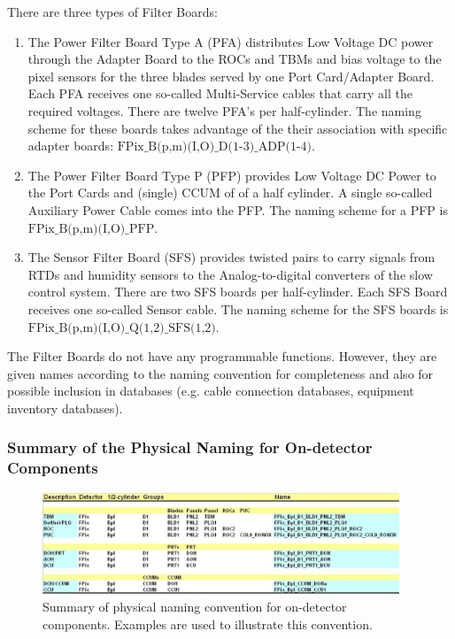 \documentclass{cmspaper}
\begin{document}
There are three types of Filter Boards:
\begin{enumerate}
\item The Power Filter Board Type A (PFA) distributes Low Voltage DC power 
through the Adapter Board to the ROCs and TBMs
and bias voltage to the pixel sensors for the three blades served by one Port Card/Adapter Board. Each PFA
receives one so-called Multi-Service cables that carry all the required voltages. There are twelve PFA's per 
half-cylinder. The naming scheme for these boards takes advantage of the their association with specific
adapter boards:
$\mbox{FPix\_B(p,m)(I,O)\_D(1-3)\_ADP(1-4)}$.
\item The Power Filter Board Type P (PFP) provides Low Voltage DC Power to the Port Cards and (single) CCUM of
of a half cylinder. A single so-called Auxiliary Power Cable comes into the PFP. The naming scheme for
a PFP is $\mbox{FPix\_B(p,m)(I,O)\_PFP}$.
\item The Sensor Filter Board (SFS) provides twisted pairs to carry signals from RTDs and humidity
sensors to the Analog-to-digital converters of the slow control system. There are two SFS boards 
per half-cylinder. Each SFS Board receives one so-called Sensor cable. The naming scheme for
the SFS boards is $\mbox{FPix\_B(p,m)(I,O)\_Q(1,2)\_SFS(1,2)}$. 
\end{enumerate}

The Filter Boards do not  have any programmable functions. 
However, they are given names according to the naming convention 
for completeness and also for possible inclusion in databases 
(e.g. cable connection databases, equipment inventory databases).


\subsubsection{Summary of the Physical Naming for On-detector Components}

\begin{figure}[hbtp]   
  \begin{center}   
        \includegraphics[width =0.95\textwidth]{summary_v1.eps}   
    \caption{Summary of physical naming convention for on-detector components. 
Examples are used to illustrate this convention. }
    \label{figure:summary}   
  \end{center}   
\end{figure} 
\end{document}
